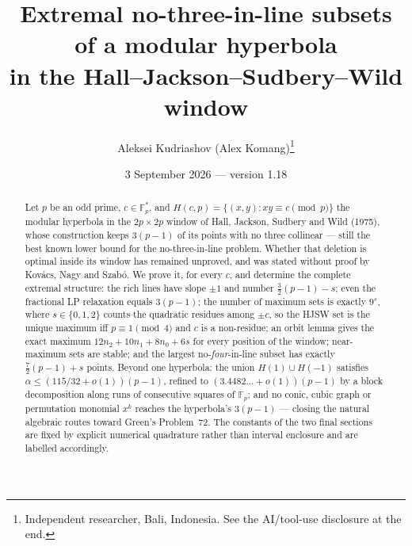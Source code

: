 \documentclass[11pt]{article}
\title{Extremal no-three-in-line subsets of a modular hyperbola\\ in the Hall--Jackson--Sudbery--Wild window}
\author{Aleksei Kudriashov (Alex Komang)\thanks{Independent researcher, Bali, Indonesia.  See the AI/tool-use disclosure at the end.}}
\date{3 September 2026 --- version 1.18}
\theoremstyle{remark}
\newcommand{\Fp}{\mathbb{F}_p}
\newcommand{\Hc}{H(c,p)}
\begin{document}
\maketitle

\begin{abstract}
Let $p$ be an odd prime, $c\in\Fp^*$, and $\Hc=\{(x,y):xy\equiv c\pmod p\}$ the modular hyperbola in the
$2p\times2p$ window of Hall, Jackson, Sudbery and Wild (1975), whose construction keeps $3(p-1)$ of its points
with no three collinear --- still the best known lower bound for the no-three-in-line problem.  Whether that
deletion is optimal inside its window has remained unproved, and was stated without proof by Kov\'acs, Nagy and
Szab\'o.  We prove it, for every $c$, and determine the complete extremal structure: the rich lines have slope
$\pm1$ and number $\tfrac32(p-1)-s$; even the fractional LP relaxation equals $3(p-1)$; the number of maximum
sets is exactly $9^s$, where $s\in\{0,1,2\}$ counts the quadratic residues among $\pm c$, so the HJSW set is the
unique maximum iff $p\equiv1\pmod4$ and $c$ is a non-residue; an orbit lemma gives the exact maximum
$12n_2+10n_1+8n_0+6s$ for every position of the window; near-maximum sets are stable; and the largest
no-\emph{four}-in-line subset has exactly $\tfrac72(p-1)+s$ points.  Beyond one hyperbola: the union
$H(1)\cup H(-1)$ satisfies $\alpha\le(115/32+o(1))(p-1)$, refined to $(3.4482\ldots+o(1))(p-1)$ by a block
decomposition along runs of consecutive squares of $\Fp$; and no conic, cubic graph or permutation monomial
$x^k$ reaches the hyperbola's $3(p-1)$ --- closing the natural algebraic routes toward Green's Problem~72.
The constants of the two final sections are fixed by explicit numerical quadrature rather than interval
enclosure and are labelled accordingly.
\end{abstract}
\end{document}
